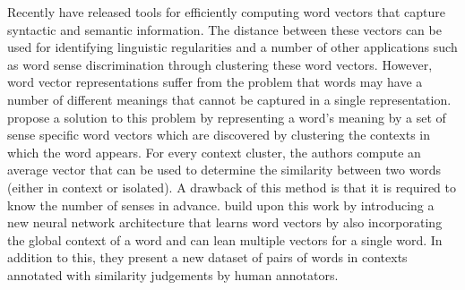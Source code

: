 \documentclass[11pt]{article}
\begin{document}
Recently \cite{word2vec} have released tools for efficiently computing word vectors that capture syntactic and semantic information. The distance between these vectors can be used for identifying linguistic regularities \cite{regularities} and a number of other applications such as word sense discrimination through clustering these word vectors. However, word vector representations suffer from the problem that words may have a number of different meanings that cannot be captured in a single representation. \cite{multi} propose a solution to this problem by representing a word's meaning by a set of sense specific word vectors which are discovered by clustering the contexts in which the word appears. For every context cluster, the authors compute an average vector that can be used to determine the similarity between two words (either in context or isolated). A drawback of this method is that it is required to know the number of senses in advance. \cite{global} build upon this work by introducing a new neural network architecture that learns word vectors by also incorporating the global context of a word and can lean multiple vectors for a single word. In addition to this, they present a new dataset of pairs of words in contexts annotated with similarity judgements by human annotators. 
\end{document}
